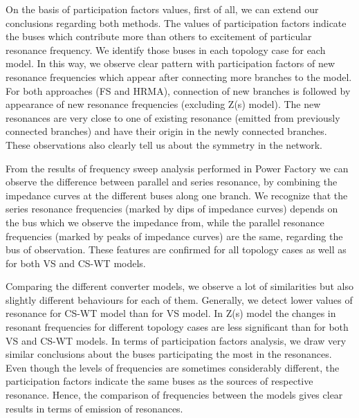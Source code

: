 \documentclass[a4paper,11pt,twoside]{report} %
\begin{document}
On the basis of participation factors values, first of all, we can extend our conclusions regarding both methods. The values of participation factors indicate the buses which contribute more than others to excitement of particular resonance frequency. We identify those buses in each topology case for each model. In this way, we observe clear pattern with participation factors of new resonance frequencies which appear after connecting more branches to the model. For both approaches (FS and HRMA), connection of new branches is followed by appearance of new resonance frequencies (excluding Z(s) model). The new resonances are very close to one of existing resonance (emitted from previously connected branches) and have their origin in the newly connected branches. These observations also clearly tell us about the symmetry in the network.

From the results of frequency sweep analysis performed in Power Factory we can observe the difference between parallel and series resonance, by combining the impedance curves at the different buses along one branch. We recognize that the series resonance frequencies (marked by dips of impedance curves) depends on the bus which we observe the impedance from, while the parallel resonance frequencies (marked by peaks of impedance curves) are the same, regarding the bus of observation. These features are confirmed for all topology cases as well as for both VS and CS-WT models.

Comparing the different converter models, we observe a lot of similarities but also slightly different behaviours for each of them. Generally, we detect lower values of resonance for CS-WT model than for VS model. In Z(s) model the changes in resonant frequencies for different topology cases are less significant than for both VS and CS-WT models. In terms of participation factors analysis, we draw very similar conclusions about the buses participating the most in the resonances. Even though the levels of frequencies are sometimes considerably different, the participation factors indicate the same buses as the sources of respective resonance. Hence, the comparison of frequencies between the models gives clear results in terms of emission of resonances.
\end{document}
